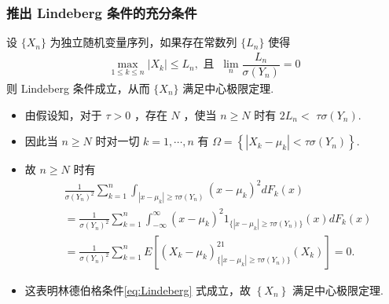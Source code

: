 \documentclass[Prob-All.tex]{subfiles}
\begin{document}
\begin{frame}
	\frametitle{推出 Lindeberg 条件的充分条件}
	\begin{thm}
		设 $\{X_n\}$ 为独立随机变量序列，如果存在常数列 $\{L_n\}$ 使得
		\begin{eqnarray*}
			\max_{1\leq k\leq n}|X_k|\leq L_n, \mbox{ 且  }\  \lim_{n}\dfrac{L_n}{\sigma(Y_n)}=0
		\end{eqnarray*}
		则 Lindeberg 条件成立，从而 $\{X_n\}$ 满足中心极限定理.
	\end{thm}

\begin{itemize}
	\item 由假设知，对于 $\tau>0$ ，存在 $N$ ，使当 $n \geq N$ 时有 $2 L_{n}<$ $\tau \sigma(Y_n)$.
	\item 因此当 $n \geq N$ 时对一切 $k=1, \cdots, n$ 有 $\Omega=\left\{\left|X_{k}-\mu_{k}\right|<\tau \sigma(Y_n)\right\}$.
	\item 故 $n \geq N$ 时有
	{\small \begin{align*}
		&\frac{1}{\sigma(Y_n)^{2}} \sum_{k=1}^{n} \int_{\left|x-\mu_{k}\right|\geq \tau \sigma(Y_n)}\left(x-\mu_{k}\right)^{2} d F_{k}(x)\\
		&=\frac{1}{\sigma(Y_n)^{2}} \sum_{k=1}^{n} \int_{-\infty}^\infty\left(x-\mu_{k}\right)^{2}1_{\{\left|x-\mu_{k}\right|\geq \tau \sigma(Y_n)\}}(x) d F_{k}(x)\\
		&=\frac{1}{\sigma(Y_n)^{2}} \sum_{k=1}^{n} E[(X_k-\mu_k)^21_{\{\left|x-\mu_{k}\right|\geq \tau \sigma(Y_n)\}}(X_k) ]=0 .
	\end{align*}}
\item 这表明林德伯格条件\eqref{eq:Lindeberg} 式成立，故 $\left\{X_{n}\right\}$ 满足中心极限定理.
\end{itemize}




\end{frame}
\end{document}
